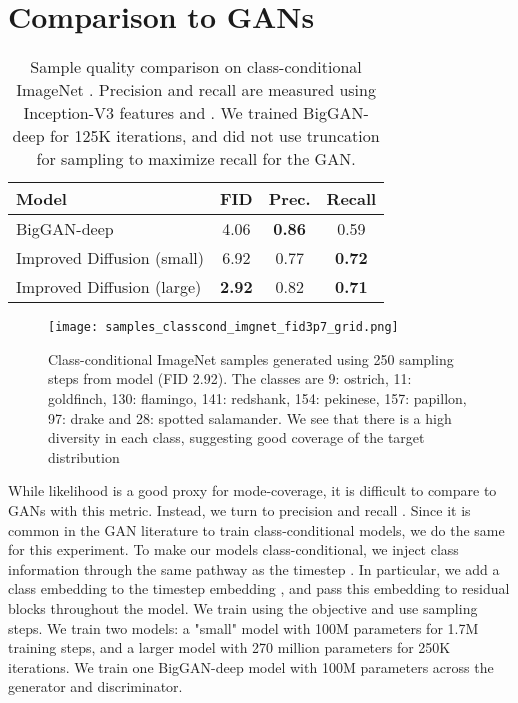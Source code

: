 \documentclass{article}
\begin{document}
\section{Comparison to GANs}
\begin{table}[t]
    \caption{\label{tbl:classcondfid} Sample quality comparison on class-conditional ImageNet . Precision and recall \citep{improvedpr} are measured using Inception-V3 features and . We trained BigGAN-deep for 125K iterations, and did not use truncation for sampling to maximize recall for the GAN.}
    \centering
    \vskip 0.15in
	\begin{center}
	\begin{small}
    \begin{tabular}{lccc}
        \toprule
        Model & FID & Prec. & Recall \\
        \midrule
        BigGAN-deep \citep{biggan} & 4.06 & \bf 0.86 & 0.59 \\
        Improved Diffusion (small) & 6.92 & 0.77 & \bf 0.72 \\ 
        Improved Diffusion (large) & \bf 2.92 & 0.82 & \bf 0.71 \\
        \bottomrule
    \end{tabular}
\end{small}
\end{center}
\vskip -0.1in
\end{table}

\begin{figure}[t]
\begin{center}
\centerline{\texttt{[image: samples\_classcond\_imgnet\_fid3p7\_grid.png]}}
\caption{\label{fig:classcond} Class-conditional ImageNet  samples generated using 250 sampling steps from  model (FID 2.92). The classes are 9: ostrich, 11: goldfinch, 130: flamingo, 141: redshank, 154: pekinese, 157: papillon, 97: drake and 28: spotted salamander. We see that there is a high diversity in each class, suggesting good coverage of the target distribution}
\end{center}
\vskip -0.2in
\end{figure}

While likelihood is a good proxy for mode-coverage, it is difficult to compare to GANs with this metric. Instead, we turn to precision and recall \citep{improvedpr}. Since it is common in the GAN literature to train class-conditional models, we do the same for this experiment. To make our models class-conditional, we inject class information through the same pathway as the timestep . In particular, we add a class embedding  to the timestep embedding , and pass this embedding to residual blocks throughout the model. We train using the  objective and use  sampling steps. We train two models: a "small" model with 100M parameters for 1.7M training steps, and a larger model with 270 million parameters for 250K iterations. We train one BigGAN-deep model with 100M parameters across the generator and discriminator.
\end{document}

